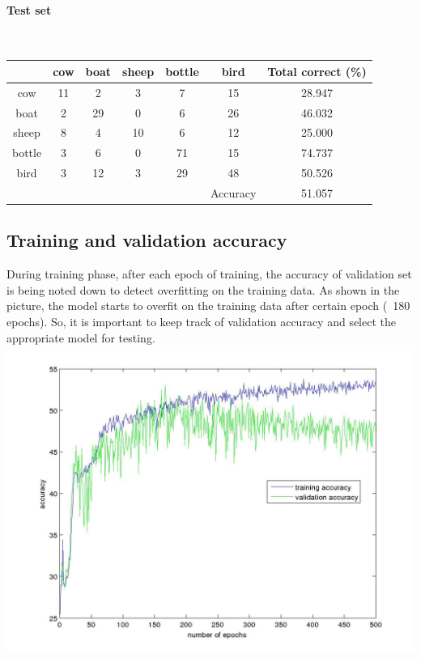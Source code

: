 \documentclass[fleqn]{article}
\newcommand{\myparagraph}[1]{\paragraph{#1}\mbox{}\\}
\begin{document}
\myparagraph{Test set}

\begin{center}
  \begin{longtable}{ c | c | c | c | c | c | c}
  	\multicolumn{1}{c}{} &
	\multicolumn{1}{c}{cow} & 
	\multicolumn{1}{c}{boat } & 
	\multicolumn{1}{c}{sheep } &
	\multicolumn{1}{c}{bottle } & 
	\multicolumn{1}{c}{bird } &
	\multicolumn{1}{c}{Total correct (\%) }\\
    \hline
    cow       &  11     &  2     &  3   &    7   &   15     & 28.947\\\hline 
    boat      &  2      & 29     &  0   &    6   &   26     & 46.032\\\hline
    sheep     &  8      &  4     & 10   &    6   &   12     & 25.000\\\hline
    bottle    &  3      &  6     &  0   &   71   &   15     & 74.737\\\hline
    bird      &  3      & 12     &  3   &   29   &   48     & 50.526\\\hline
              &         &        &      &        & Accuracy & 51.057\\\hline
  \end{longtable}
\end{center}

\subsection{Training and validation accuracy}
During training phase, after each epoch of training, the accuracy of validation set is being noted down to detect overfitting on the training data.
As shown in the picture, the model starts to overfit on the training data after certain epoch (~180 epochs). 
So, it is important to keep track of validation accuracy and select the appropriate model for testing.\\  
\includegraphics[scale=0.4]{../src/imageclassification/bestmodels/filt=5-hidden1=5-hidden2=15-hidden3=5-fc1=300-fc2=150/accuracy_trend.jpg}\\
\end{document}
